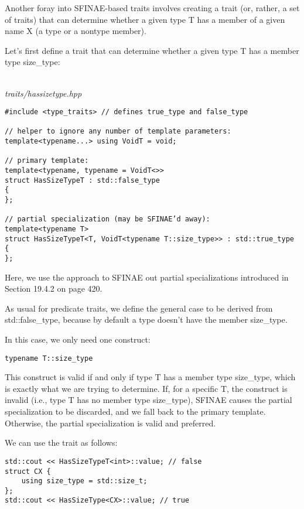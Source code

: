 
Another foray into SFINAE-based traits involves creating a trait (or, rather, a set of traits) that can
determine whether a given type T has a member of a given name X (a type or a nontype member).


Let’s first define a trait that can determine whether a given type T has a member type size\_type:

\hspace*{\fill} \\ %
\noindent
\textit{traits/hassizetype.hpp}
\begin{lstlisting}[style=styleCXX]
#include <type_traits> // defines true_type and false_type

// helper to ignore any number of template parameters:
template<typename...> using VoidT = void;

// primary template:
template<typename, typename = VoidT<>>
struct HasSizeTypeT : std::false_type
{
};

// partial specialization (may be SFINAE’d away):
template<typename T>
struct HasSizeTypeT<T, VoidT<typename T::size_type>> : std::true_type
{
};
\end{lstlisting}

Here, we use the approach to SFINAE out partial specializations introduced in Section 19.4.2 on page 420.

As usual for predicate traits, we define the general case to be derived from std::false\_type, because by default a type doesn’t have the member size\_type.

In this case, we only need one construct:

\begin{lstlisting}[style=styleCXX]
typename T::size_type
\end{lstlisting}

This construct is valid if and only if type T has a member type size\_type, which is exactly what we are trying to determine. If, for a specific T, the construct is invalid (i.e., type T has no member type size\_type), SFINAE causes the partial specialization to be discarded, and we fall back to the primary template. Otherwise, the partial specialization is valid and preferred.

We can use the trait as follows:

\begin{lstlisting}[style=styleCXX]
std::cout << HasSizeTypeT<int>::value; // false
struct CX {
	using size_type = std::size_t;
};
std::cout << HasSizeType<CX>::value; // true
\end{lstlisting}

